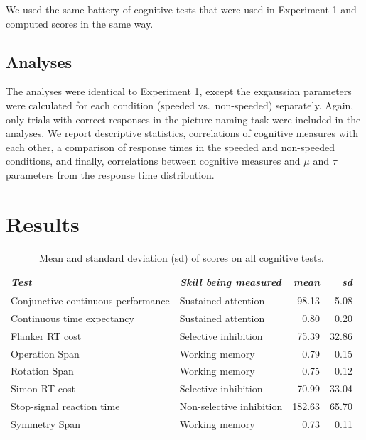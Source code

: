 \documentclass[
  man,floatsintext]{apa6}
\begin{document}
We used the same battery of cognitive tests that were used in Experiment 1 and computed scores in the same way.

\hypertarget{analyses-1}{%
\subsection{Analyses}\label{analyses-1}}

The analyses were identical to Experiment 1, except the exgaussian parameters were calculated for each condition (speeded vs.~non-speeded) separately. Again, only trials with correct responses in the picture naming task were included in the analyses. We report descriptive statistics, correlations of cognitive measures with each other, a comparison of response times in the speeded and non-speeded conditions, and finally, correlations between cognitive measures and \(\mu\) and \(\tau\) parameters from the response time distribution.

\hypertarget{results-1}{%
\section{Results}\label{results-1}}

\begin{table}

\caption{\label{tab:cogskillsdesstatsE2}Mean and standard deviation (sd) of scores on all cognitive tests.}
\centering
\begin{tabular}[t]{llrr}
\toprule
\em{Test} & \em{Skill being measured} & \em{mean} & \em{sd}\\
\midrule
Conjunctive continuous
 performance & Sustained attention & 98.13 & 5.08\\
Continuous time
 expectancy & Sustained attention & 0.80 & 0.20\\
Flanker RT cost & Selective inhibition & 75.39 & 32.86\\
Operation Span & Working memory & 0.79 & 0.15\\
Rotation Span & Working memory & 0.75 & 0.12\\
\addlinespace
Simon RT cost & Selective inhibition & 70.99 & 33.04\\
Stop-signal reaction time & Non-selective inhibition & 182.63 & 65.70\\
Symmetry Span & Working memory & 0.73 & 0.11\\
\bottomrule
\end{tabular}
\end{table}
\end{document}
